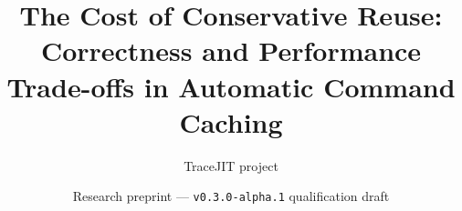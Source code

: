 \documentclass[11pt,a4paper]{article}
\title{The Cost of Conservative Reuse:\\
Correctness and Performance Trade-offs in Automatic Command Caching}
\author{TraceJIT project}
\date{Research preprint --- \texttt{v0.3.0-alpha.1} qualification draft}
\begin{document}
\maketitle

\begin{abstract}

\end{abstract}











\end{document}
